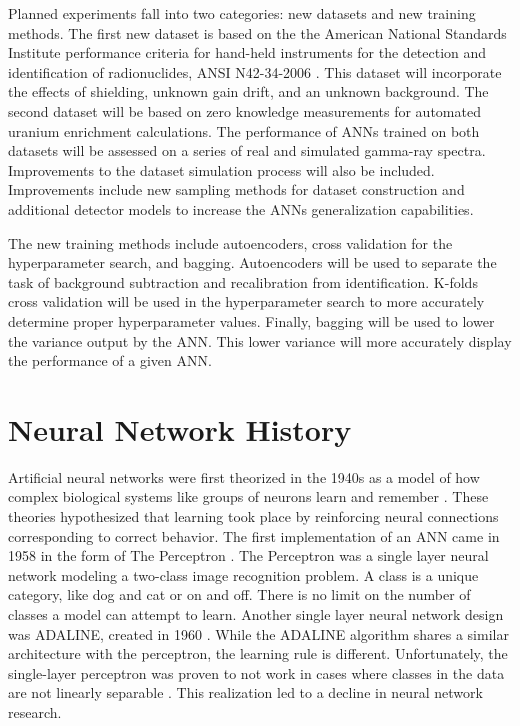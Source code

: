 Planned experiments fall into two categories: new datasets and new training methods. The first new dataset is based on the the American National Standards Institute performance criteria for hand-held instruments for the detection and identification of radionuclides, ANSI N42-34-2006 \cite{ANSI}. This dataset will incorporate the effects of shielding, unknown gain drift, and an unknown background. The second dataset will be based on zero knowledge measurements for automated uranium enrichment calculations. The performance of ANNs trained on both datasets will be assessed on a series of real and simulated gamma-ray spectra. Improvements to the dataset simulation process will also be included. Improvements include new sampling methods for dataset construction and additional detector models to increase the ANNs generalization capabilities.

The new training methods include autoencoders, cross validation for the hyperparameter search, and bagging. Autoencoders will be used to separate the task of background subtraction and recalibration from identification. K-folds cross validation will be used in the hyperparameter search to more accurately determine proper hyperparameter values. Finally, bagging will be used to lower the variance output by the ANN. This lower variance will more accurately display the performance of a given ANN. 

\section{Neural Network History}


Artificial neural networks were first theorized in the 1940s as a model of how complex biological systems like groups of neurons learn and remember \cite{Pitts1943, Hebb1949}. These theories hypothesized that learning took place by reinforcing neural connections corresponding to correct behavior. The first implementation of an ANN came in 1958 in the form of The Perceptron \cite{Rosenblatt1958, Rosenblatt1962}. The Perceptron was a single layer neural network modeling a two-class image recognition problem. A class is a unique category, like dog and cat or on and off. There is no limit on the number of classes a model can attempt to learn. Another single layer neural network design was ADALINE, created in 1960 \cite{Widrow1960}. While the ADALINE algorithm shares a similar architecture with the perceptron, the learning rule is different. Unfortunately, the single-layer perceptron was proven to not work in cases where classes in the data are not linearly separable \cite{Minsky1969}. This realization led to a decline in neural network research.

